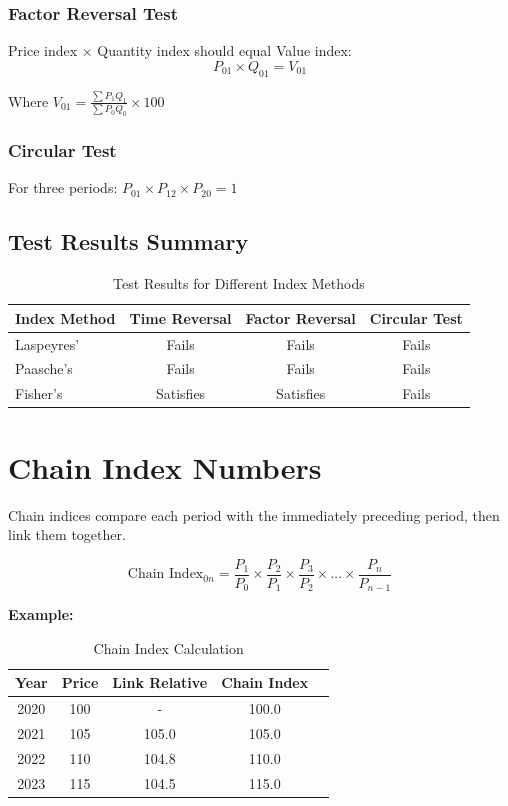 \documentclass[twoside]{book}
\begin{document}
\subsubsection{Factor Reversal Test}
Price index × Quantity index should equal Value index:
\begin{equation}
    P_{01} \times Q_{01} = V_{01}
\end{equation}

Where $V_{01} = \frac{\sum P_1 Q_1}{\sum P_0 Q_0} \times 100$

\subsubsection{Circular Test}
For three periods: $P_{01} \times P_{12} \times P_{20} = 1$

\subsection{Test Results Summary}

\begin{table}[h]
\centering
\caption{Test Results for Different Index Methods}
\begin{tabular}{lccc}
\toprule
\textbf{Index Method} & \textbf{Time Reversal} & \textbf{Factor Reversal} & \textbf{Circular Test} \\
\midrule
Laspeyres' & Fails & Fails & Fails \\
Paasche's & Fails & Fails & Fails \\
Fisher's & Satisfies & Satisfies & Fails \\
\bottomrule
\end{tabular}
\end{table}

\section{Chain Index Numbers}

Chain indices compare each period with the immediately preceding period, then link them together.

\begin{equation}
    \text{Chain Index}_{0n} = \frac{P_1}{P_0} \times \frac{P_2}{P_1} \times \frac{P_3}{P_2} \times \ldots \times \frac{P_n}{P_{n-1}}
\end{equation}

\textbf{Example:}

\begin{table}[h]
\centering
\caption{Chain Index Calculation}
\begin{tabular}{ccccc}
\toprule
\textbf{Year} & \textbf{Price} & \textbf{Link Relative} & \textbf{Chain Index} \\
\midrule
2020 & 100 & - & 100.0 \\
2021 & 105 & 105.0 & 105.0 \\
2022 & 110 & 104.8 & 110.0 \\
2023 & 115 & 104.5 & 115.0 \\
\bottomrule
\end{tabular}
\end{table}
\end{document}
